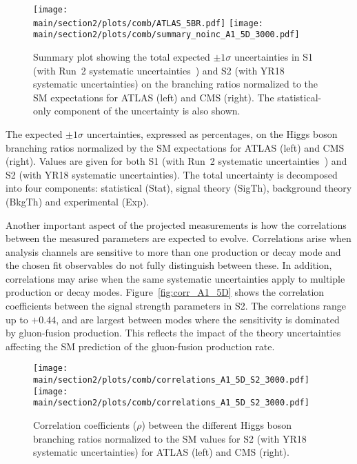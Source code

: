 \begin{figure}[hbtp]
\centering
\texttt{[image: \\main/section2/plots/comb/ATLAS\_5BR.pdf]}%
\texttt{[image: \\main/section2/plots/comb/summary\_noinc\_A1\_5D\_3000.pdf]}%
\caption{Summary plot showing the total expected $\pm 1\sigma$ uncertainties in S1 (with Run~2 systematic uncertainties~\cite{Sirunyan:2018koj}) and S2 (with YR18 systematic uncertainties) on the branching ratios normalized to the SM expectations for ATLAS (left) and CMS (right). The statistical-only component of the uncertainty is also shown.}
\label{fig:summary_A1_5D}
\end{figure}


\begin{table}[hbtp]
\centering
\caption{The expected $\pm 1\sigma$ uncertainties, expressed as percentages, on the Higgs boson branching ratios normalized by the SM expectations for ATLAS (left) and CMS (right). Values are given for both S1 (with Run~2 systematic uncertainties~\cite{Sirunyan:2018koj}) and S2 (with YR18 systematic uncertainties). The total uncertainty is decomposed into four components: statistical (Stat), signal theory (SigTh), background theory (BkgTh) and experimental (Exp).}


\label{tab:summary_A1_5D}
\vspace{0.5cm}
\end{table}

Another important aspect of the projected measurements is how the correlations between the measured parameters are expected to evolve. Correlations arise when analysis channels are sensitive to more than one production or decay mode and the chosen fit observables do not fully distinguish between these. In addition, correlations may arise when the same systematic uncertainties apply to multiple production or decay modes. Figure~\ref{fig:corr_A1_5D} shows the correlation coefficients between the signal strength parameters in S2. The correlations range up to $+0.44$, and are largest between modes where the sensitivity is dominated by gluon-fusion production. This reflects the impact of the theory uncertainties affecting the SM prediction of the gluon-fusion production rate.

\begin{figure}[hbtp]
\centering
\texttt{[image: \\main/section2/plots/comb/correlations\_A1\_5D\_S2\_3000.pdf]}%
\texttt{[image: \\main/section2/plots/comb/correlations\_A1\_5D\_S2\_3000.pdf]}%
\caption{Correlation coefficients ($\rho$) between the different Higgs boson branching ratios normalized to the SM values for S2 (with YR18 systematic uncertainties) for ATLAS (left) and CMS (right).}
\label{fig:comb_5D}
\end{figure}

